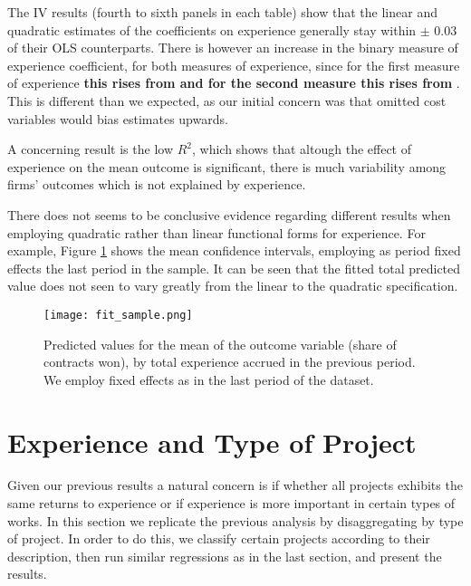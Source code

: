 The IV results (fourth to sixth panels in each table) show that  the linear and quadratic estimates of the coefficients on experience generally stay within $\pm$ 0.03 of their OLS counterparts. There is however an increase in the binary measure of experience coefficient, for both measures of experience, since for the first measure of experience \textbf{this rises from and for the second measure this rises from} . This is different than we expected, as our initial concern was that omitted cost variables would bias estimates upwards.

A concerning result is the low $R^2$, which shows that altough the effect of experience on the mean outcome is significant, there is much variability among firms' outcomes which is not explained by experience.
\clearpage





\clearpage
There does not seems to be conclusive evidence regarding different results when employing quadratic rather than linear functional forms for experience. For example, Figure \ref{fig:pred_average} shows the mean confidence intervals, employing as period fixed effects the last period in the sample. It can be seen that the fitted total predicted value does not seen to vary greatly from the linear to the quadratic specification.

\begin{figure}[H]
        \centering
        \texttt{[image: fit\_sample.png]}
        \caption{ \small Predicted values for the mean of the outcome variable (share of contracts won), by total experience accrued in the previous period. We employ fixed effects as in the last period of the dataset.}
        \label{fig:pred_average}
    \end{figure}




\section{Experience and Type of Project}
Given our previous results a natural concern is if whether all projects exhibits the same returns to experience or if experience is more important in certain types of works. In this section we replicate the previous analysis by disaggregating by type of project. In order to do this, we classify certain projects according to their description, then run similar regressions as in the last section, and present the results.

